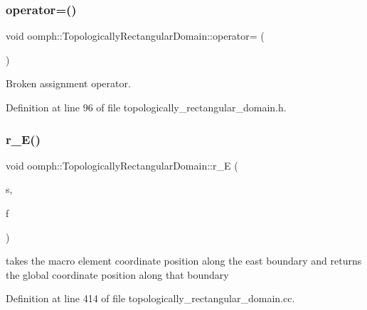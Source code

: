 \subsubsection{\texorpdfstring{operator=()}{operator=()}}
{\footnotesize\ttfamily void oomph\+::\+Topologically\+Rectangular\+Domain\+::operator= (\begin{DoxyParamCaption}\item[{const \hyperlink{classoomph_1_1TopologicallyRectangularDomain}{Topologically\+Rectangular\+Domain} \&}]{ }\end{DoxyParamCaption})\hspace{0.3cm}{\ttfamily [inline]}}



Broken assignment operator. 



Definition at line 96 of file topologically\+\_\+rectangular\+\_\+domain.\+h.

\mbox{\label{classoomph_1_1TopologicallyRectangularDomain_a02ac630af43ddea871e5d9cf543d783b}} 
\subsubsection{\texorpdfstring{r\+\_\+\+E()}{r\_E()}}
{\footnotesize\ttfamily void oomph\+::\+Topologically\+Rectangular\+Domain\+::r\+\_\+E (\begin{DoxyParamCaption}\item[{const Vector$<$ double $>$ \&}]{s,  }\item[{Vector$<$ double $>$ \&}]{f }\end{DoxyParamCaption})\hspace{0.3cm}{\ttfamily [private]}}



takes the macro element coordinate position along the east boundary and returns the global coordinate position along that boundary 



Definition at line 414 of file topologically\+\_\+rectangular\+\_\+domain.\+cc.

\mbox{\label{classoomph_1_1TopologicallyRectangularDomain_a6adb9d87f5dcedd2ede5a8da494930e5}} 
